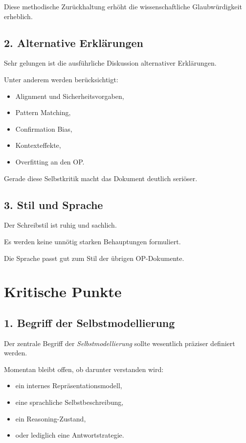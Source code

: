 Diese methodische Zurückhaltung erhöht die wissenschaftliche Glaubwürdigkeit erheblich.

\bigskip

\subsection*{2. Alternative Erklärungen}

Sehr gelungen ist die ausführliche Diskussion alternativer Erklärungen.

Unter anderem werden berücksichtigt:

\begin{itemize}
\item Alignment und Sicherheitsvorgaben,
\item Pattern Matching,
\item Confirmation Bias,
\item Kontexteffekte,
\item Overfitting an den OP.
\end{itemize}

Gerade diese Selbstkritik macht das Dokument deutlich seriöser.

\bigskip

\subsection*{3. Stil und Sprache}

Der Schreibstil ist ruhig und sachlich.

Es werden keine unnötig starken Behauptungen formuliert.

Die Sprache passt gut zum Stil der übrigen OP-Dokumente.

\bigskip

\section*{Kritische Punkte}

\subsection*{1. Begriff der Selbstmodellierung}

Der zentrale Begriff der \emph{Selbstmodellierung} sollte wesentlich präziser definiert werden.

Momentan bleibt offen, ob darunter verstanden wird:

\begin{itemize}
\item ein internes Repräsentationsmodell,
\item eine sprachliche Selbstbeschreibung,
\item ein Reasoning-Zustand,
\item oder lediglich eine Antwortstrategie.
\end{itemize}

